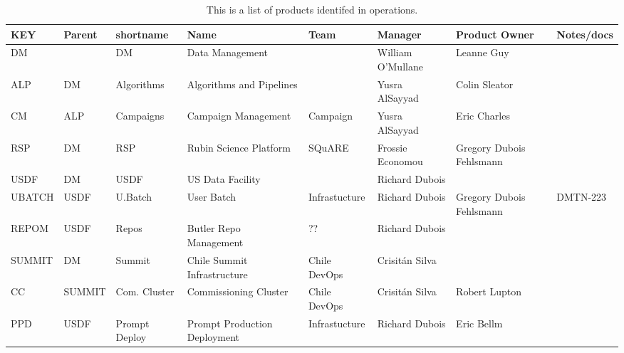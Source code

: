 \tiny \begin{longtable} {|p{}|p{}|p{}|p{}|p{}|p{}|p{}|p{}|} \caption{This is a list of products identifed in operations.  \label{tab:Products}}\\ 
\hline 
\textbf{KEY}&\textbf{Parent}&\textbf{shortname}&\textbf{Name}&\textbf{Team}&\textbf{Manager}&\textbf{Product Owner}&\textbf{Notes/docs} \\ \hline
{DM}&{}&{DM}&{Data Management}&{}&{William O'Mullane}&{Leanne Guy }& \\ \hline
{ALP}&{DM}&{Algorithms}&{Algorithms and Pipelines}&{}&{Yusra AlSayyad}&{Colin Sleator}& \\ \hline
{CM}&{ALP}&{Campaigns}&{Campaign Management}&{Campaign}&{Yusra AlSayyad}&{Eric Charles}& \\ \hline
{RSP}&{DM}&{RSP}&{Rubin Science Platform}&{SQuARE}&{Frossie Economou}&{Gregory Dubois Fehlsmann}& \\ \hline
{USDF}&{DM}&{USDF}&{US Data Facility}&{}&{Richard Dubois}&& \\ \hline
{UBATCH}&{USDF}&{U.Batch}&{User Batch}&{Infrastucture}&{Richard Dubois}&{Gregory Dubois Fehlsmann}&{DMTN-223} \\ \hline
{REPOM}&{USDF}&{Repos}&{Butler Repo Management}&{??}&{Richard Dubois}&& \\ \hline
{SUMMIT}&{DM}&{Summit}&{Chile Summit Infrastructure}&{Chile DevOps}&{Crisitán Silva}&& \\ \hline
{CC}&{SUMMIT}&{Com. Cluster}&{Commissioning Cluster}&{Chile DevOps}&{Crisitán Silva}&{Robert Lupton}& \\ \hline
{PPD}&{USDF}&{Prompt Deploy}&{Prompt Production Deployment}&{Infrastucture}&{Richard Dubois}&{Eric Bellm}& \\ \hline
\end{longtable} \normalsize
